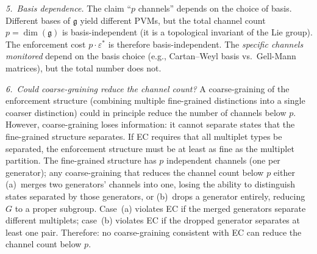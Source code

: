 \documentclass[11pt,a4paper]{article}
\theoremstyle{definition}
\begin{document}
\smallskip\noindent\textit{5.\ Basis dependence.}\quad
The claim ``$p$ channels'' depends on the choice of basis.  Different
bases of $\mathfrak{g}$ yield different PVMs, but the total channel
count $p = \dim(\mathfrak{g})$ is basis-independent (it is a
topological invariant of the Lie group).  The enforcement cost
$p \cdot \varepsilon^*$ is therefore basis-independent.  The
\emph{specific channels monitored} depend on the basis choice (e.g.,
Cartan--Weyl basis vs.\ Gell-Mann matrices), but the total number
does not.

\smallskip\noindent\textit{6.\ Could coarse-graining reduce the
channel count?}\quad
A coarse-graining of the enforcement structure (combining multiple
fine-grained distinctions into a single coarser distinction) could
in principle reduce the number of channels below $p$.  However,
coarse-graining loses information: it cannot separate states that
the fine-grained structure separates.  If EC requires that all
multiplet types be separated, the enforcement structure must be at
least as fine as the multiplet partition.  The fine-grained structure
has $p$ independent channels (one per generator); any coarse-graining
that reduces the channel count below $p$ either (a)~merges two
generators' channels into one, losing the ability to distinguish
states separated by those generators, or (b)~drops a generator
entirely, reducing $G$ to a proper subgroup.  Case~(a) violates EC
if the merged generators separate different multiplets; case~(b)
violates EC if the dropped generator separates at least one pair.
Therefore: no coarse-graining consistent with EC can reduce the
channel count below $p$.
\end{document}
